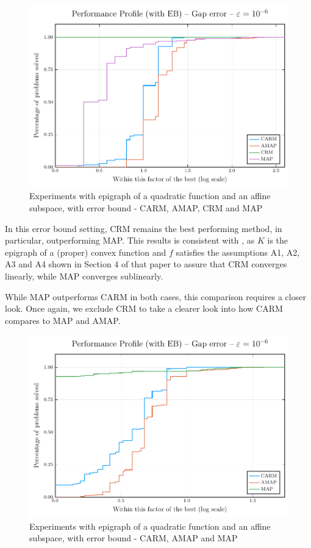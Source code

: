 \documentclass[smallextended,numbook,nospthms]{svjour3}
\theoremstyle{plain}
\theoremstyle{definition}
\begin{document}
\begin{figure}[h!]
	\centering
	\includegraphics[scale=0.8]{fig1EB}
	\caption{Experiments with epigraph of a quadratic function and an affine subspace, with error bound - CARM, AMAP, CRM and MAP}
	\label{fig:perprof EB 1}
\end{figure}

In this error bound setting, CRM remains the best performing method, in particular, outperforming MAP. This results is consistent with \cite{Behling:2020}, as $K$ is the epigraph of a (proper) convex function and $f$ satisfies the assumptions A1, A2, A3 and A4 shown in Section 4 of that paper to assure that CRM converges linearly, while MAP converges sublinearly.

While MAP outperforms CARM in both cases, this comparison requires a closer look. Once again, we exclude CRM to take a clearer look into how CARM compares to MAP and AMAP.

\begin{figure}[h!]
	\centering
	\includegraphics[scale=0.8]{fig2EB}
	\caption{Experiments with epigraph of a quadratic function and an affine subspace, with error bound - CARM, AMAP and MAP}
	\label{fig:perprof EB 2}
\end{figure}
\end{document}
